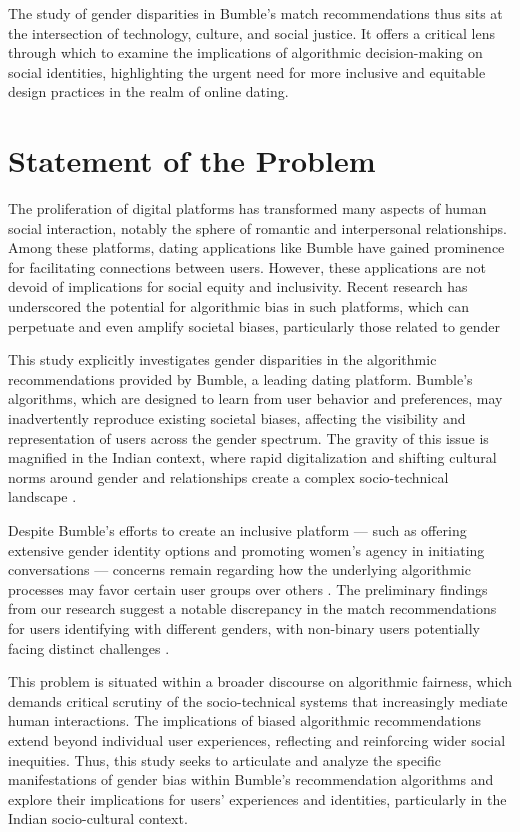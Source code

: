 The study of gender disparities in Bumble's match recommendations thus sits at the intersection of technology, culture, and social justice. It offers a critical lens through which to examine the implications of algorithmic decision-making on social identities, highlighting the urgent need for more inclusive and equitable design practices in the realm of online dating.

\section{Statement of the Problem}
The proliferation of digital platforms has transformed many aspects of human social interaction, notably the sphere of romantic and interpersonal relationships. Among these platforms, dating applications like Bumble have gained prominence for facilitating connections between users. However, these applications are not devoid of implications for social equity and inclusivity. Recent research has underscored the potential for algorithmic bias in such platforms, which can perpetuate and even amplify societal biases, particularly those related to gender \cite{Hutson_Taft_Barocas_Levy_2018, Lambrecht_Tucker_2019, Selbst_Boyd_Friedler_Venkatasubramanian_Vertesi_2019}

This study explicitly investigates gender disparities in the algorithmic recommendations provided by Bumble, a leading dating platform. Bumble’s algorithms, which are designed to learn from user behavior and preferences, may inadvertently reproduce existing societal biases, affecting the visibility and representation of users across the gender spectrum. The gravity of this issue is magnified in the Indian context, where rapid digitalization and shifting cultural norms around gender and relationships create a complex socio-technical landscape \cite{Das_2019, Forbes_2020}.

Despite Bumble's efforts to create an inclusive platform — such as offering extensive gender identity options and promoting women's agency in initiating conversations — concerns remain regarding how the underlying algorithmic processes may favor certain user groups over others \cite{Bivens_Hoque_2018, MacLeod_McArthur_2019}. The preliminary findings from our research suggest a notable discrepancy in the match recommendations for users identifying with different genders, with non-binary users potentially facing distinct challenges \cite{Kalra_Gupta_Varghese_Rangaswamy_2023}.

This problem is situated within a broader discourse on algorithmic fairness, which demands critical scrutiny of the socio-technical systems that increasingly mediate human interactions. The implications of biased algorithmic recommendations extend beyond individual user experiences, reflecting and reinforcing wider social inequities. Thus, this study seeks to articulate and analyze the specific manifestations of gender bias within Bumble's recommendation algorithms and explore their implications for users’ experiences and identities, particularly in the Indian socio-cultural context.

